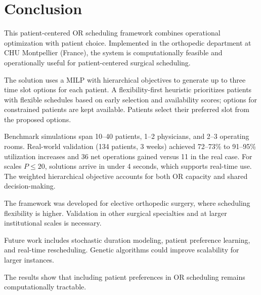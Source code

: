 \section{Conclusion}

This patient-centered OR scheduling framework combines operational optimization with patient choice. Implemented in the orthopedic department at CHU Montpellier (France), the system is computationally feasible and operationally useful for patient-centered surgical scheduling.


The solution uses a MILP with hierarchical objectives to generate up to three time slot options for each patient. A flexibility-first heuristic prioritizes patients with flexible schedules based on early selection and availability scores; options for constrained patients are kept available. Patients select their preferred slot from the proposed options.

Benchmark simulations span 10--40 patients, 1--2 physicians, and 2--3 operating rooms. Real-world validation (134 patients, 3 weeks) achieved 72--73\% to 91--95\% utilization increases and 36 net operations gained versus 11 in the real case. For scales $P \le 20$, solutions arrive in under 4 seconds, which supports real-time use. The weighted hierarchical objective accounts for both OR capacity and shared decision-making.


The framework was developed for elective orthopedic surgery, where scheduling flexibility is higher. Validation in other surgical specialties and at larger institutional scales is necessary.

Future work includes stochastic duration modeling, patient preference learning, and real-time rescheduling. Genetic algorithms could improve scalability for larger instances.

The results show that including patient preferences in OR scheduling remains computationally tractable.

